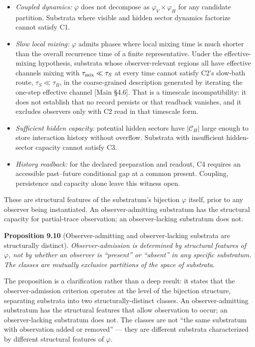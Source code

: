 \documentclass[
]{article}
\providecommand{\tightlist}{%
  \setlength{\itemsep}{0pt}\setlength{\parskip}{0pt}}
\begin{document}
\begin{itemize}
\tightlist
\item
  \emph{Coupled dynamics:} \(\varphi\) does not decompose as
  \(\varphi_V \times \varphi_H\) for any candidate partition. Substrata
  where visible and hidden sector dynamics factorize cannot satisfy C1.
\item
  \emph{Slow local mixing:} \(\varphi\) admits phases where local mixing
  time is much shorter than the overall recurrence time of a finite
  representative. Under the effective-mixing hypothesis, substrata whose
  observer-relevant regions all have effective channels mixing with
  \(\tau_{\rm mix} \ll \tau_S\) at every time cannot satisfy C2's
  slow-bath route, \(\tau_S \ll \tau_B\), in the coarse-grained
  description generated by iterating the one-step effective channel
  {[}Main §4.6{]}. That is a timescale incompatibility: it does not
  establish that no record persists or that readback vanishes, and it
  excludes observers only with C2 read in that timescale form.
\item
  \emph{Sufficient hidden capacity:} potential hidden sectors have
  \(|\mathcal{C}_H|\) large enough to store interaction history without
  overflow. Substrata with insufficient hidden-sector capacity cannot
  satisfy C3.
\item
  \emph{History readback:} for the declared preparation and readout, C4
  requires an accessible past--future conditional gap at a common
  present. Coupling, persistence and capacity alone leave this witness
  open.
\end{itemize}

These are structural features of the substratum's bijection \(\varphi\)
itself, prior to any observer being instantiated. An observer-admitting
substratum has the structural capacity for partial-trace observation; an
observer-lacking substratum does not.

\textbf{Proposition 9.10} (Observer-admitting and observer-lacking
substrata are structurally distinct). \emph{Observer-admission is
determined by structural features of \(\varphi\), not by whether an
observer is ``present'' or ``absent'' in any specific substratum. The
classes are mutually exclusive partitions of the space of substrata.}

The proposition is a clarification rather than a deep result: it states
that the observer-admission criterion operates at the level of the
bijection structure, separating substrata into two structurally-distinct
classes. An observer-admitting substratum has the structural features
that allow observation to occur; an observer-lacking substratum does
not. The classes are not ``the same substratum with observation added or
removed'' --- they are different substrata characterized by different
structural features of \(\varphi\).
\end{document}

